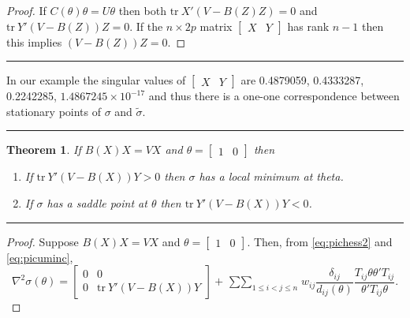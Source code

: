 \documentclass[
  12pt,
]{book}
\providecommand{\tightlist}{%
  \setlength{\itemsep}{0pt}\setlength{\parskip}{0pt}}
\newtheorem{theorem}{Theorem}[chapter]
\theoremstyle{definition}
\theoremstyle{definition}
\theoremstyle{definition}
\theoremstyle{definition}
\theoremstyle{remark}
\begin{document}
\begin{proof}
If \(C(\theta)\theta=U\theta\) then both \(\text{tr}\ X'(V-B(Z)Z)=0\)
and \(\text{tr}\ Y'(V-B(Z))Z=0\). If the \(n\times 2p\) matrix
\(\begin{bmatrix}X&Y\end{bmatrix}\) has rank \(n-1\) then this implies
\((V-B(Z))Z=0\).
\end{proof}

\begin{center}\rule{0.5\linewidth}{0.5pt}\end{center}

In our example the singular values of \(\begin{bmatrix}X&Y\end{bmatrix}\)
are 0.4879059, 0.4333287, 0.2242285, \ensuremath{1.4867245\times 10^{-17}} and thus there is a one-one correspondence
between stationary points of \(\sigma\) and \(\tilde\sigma\).

\begin{center}\rule{0.5\linewidth}{0.5pt}\end{center}

\begin{theorem}
\protect\hypertarget{thm:picsecder}{}{\label{thm:picsecder} }If \(B(X)X=VX\) and \(\theta=\begin{bmatrix}1&0\end{bmatrix}\) then

\begin{enumerate}
\def\labelenumi{\arabic{enumi}.}
\tightlist
\item
  If \(\text{tr}\ Y'(V-B(X))Y > 0\) then \(\sigma\) has a local minimum at theta.
\item
  If \(\sigma\) has a saddle point at \(\theta\) then \(\text{tr}\ Y'(V-B(X))Y < 0\).
\end{enumerate}
\end{theorem}

\begin{center}\rule{0.5\linewidth}{0.5pt}\end{center}

\begin{proof}
Suppose \(B(X)X=VX\) and \(\theta=\begin{bmatrix}1&0\end{bmatrix}\). Then,
from \eqref{eq:pichess2} and \eqref{eq:picuminc},
\[
\nabla^2\sigma(\theta)=\begin{bmatrix}0&0\\0&\text{tr}\ Y'(V-B(X))Y\end{bmatrix}+\mathop{\sum\sum}_{1\leq i<j\leq n}
w_{ij}\frac{\delta_{ij}}{d_{ij}(\theta)}\frac{T_{ij}\theta\theta'T_{ij}}{\theta'T_{ij}\theta}.
\]
\end{proof}
\end{document}

